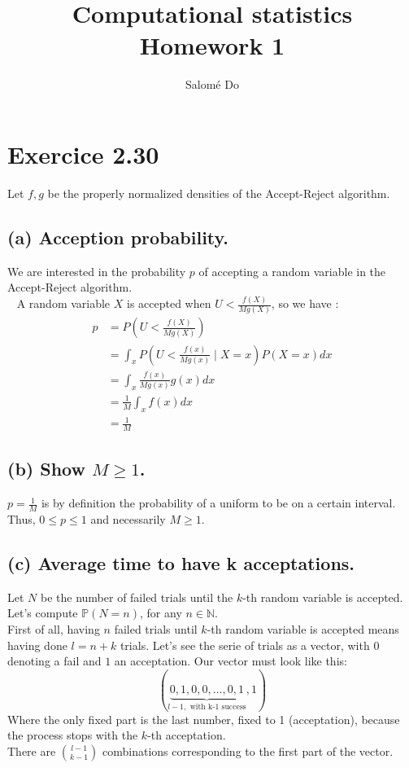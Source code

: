 \documentclass{article}
\newcommand{\N}{\mathbb N}
\begin{document}
    
\thispagestyle{empty}

\title{Computational statistics \\ Homework 1}
\author{Salomé Do}
\maketitle

\section*{Exercice 2.30}

Let $f, g$ be the properly normalized densities of the Accept-Reject algorithm.
\subsection*{(a) Acception probability.} 
We are interested in the probability $p$ of accepting a random variable in the Accept-Reject
algorithm.  \\ 
A random variable $X$ is accepted when $U < \frac{f(X)}{Mg(X)}$, so we have :
\begin{align*}
    p &= P \left (  U <  \frac{f(X)}{Mg(X)} \right )  \\
    &= \int_x P \left (  U <  \frac{f(x)}{Mg(x)} \mid X=x \right )  P(X=x) dx \\
    &=\int_x  \frac{f(x)}{Mg(x)} g(x) dx \\
    &= \frac{1}{M}\int_x f(x) dx \\
    &= \frac{1}{M}
\end{align*}

\subsection*{(b) Show $M\geq 1$.}
$p=\frac{1}{M}$ is by definition the probability of a uniform to be on a certain 
interval. Thus, $0 \leq p \leq 1$ and necessarily $M\geq 1$.

\subsection*{(c) Average time to have k acceptations.}
Let $N$ be the number of failed trials until the  $k$-th random variable is accepted.
Let's compute $\mathbb{P}(N=n)$, for any $n\in \N$. \\
First of all, having $n$ failed trials until $k$-th random variable is accepted means
having done $l = n+k$ trials. Let's see the serie of trials as a vector, with 
$0$ denoting a fail and $1$ an acceptation. Our vector must look like this:
\[(\underset{l-1,\text{ with k-1 success} }{\underbrace{0, 1,0,0,   \dots , 0, 1}}, 1)\]
Where the only fixed part is the last number, fixed to 1 (acceptation), because 
the process stops with the $k$-th acceptation. \\
There are ${l-1 \choose k-1}$ combinations corresponding to the first part of the vector.
\end{document}
